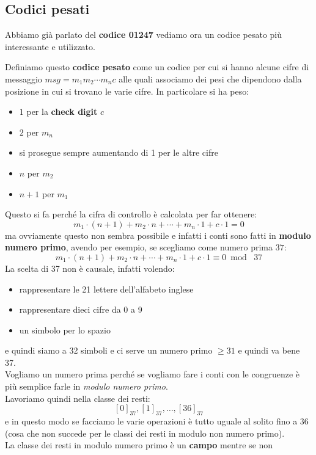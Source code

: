 \documentclass[a4paper,12pt, oneside]{book}
\begin{document}
\subsection{Codici pesati}
Abbiamo già parlato del \textbf{codice 01247} vediamo ora un codice pesato più
interessante e utilizzato.\\
\begin{definizione}
  Definiamo questo \textbf{codice pesato} come un codice per cui si hanno alcune cifre
  di messaggio $msg=m_1m_2\cdots m_nc$ alle quali associamo dei pesi che
  dipendono dalla posizione in cui si trovano le varie cifre. In particolare si
  ha peso:
  \begin{itemize}
    \item $1$ per la \textbf{check digit} $c$
    \item $2$ per $m_n$
    \item si prosegue sempre aumentando di 1 per le altre cifre
    \item $n$ per $m_2$
    \item $n+1$ per $m_1$
  \end{itemize}
\end{definizione}
Questo si fa perché la cifra di controllo è calcolata per far ottenere:
\[m_1\cdot (n+1)+m_2\cdot n+\cdots+m_n\cdot 1+c\cdot 1=0\]
ma ovviamente questo non sembra possibile e infatti i conti sono fatti in
\textbf{modulo numero primo}, avendo per esempio, se scegliamo come numero
prima $37$:
\[m_1\cdot (n+1)+m_2\cdot n+\cdots+m_n\cdot 1+c\cdot 1\equiv 0\bmod\,\, 37\]
La scelta di 37 non è causale, infatti volendo:
\begin{itemize}
  \item rappresentare le 21 lettere dell'alfabeto inglese
  \item rappresentare dieci cifre da 0 a 9
  \item un simbolo per lo spazio
\end{itemize}
e quindi siamo a 32 simboli e ci serve un numero primo $\geq 31$ e quindi va
bene 37.\\
Vogliamo un numero prima perché se vogliamo fare i conti con le congruenze è
più semplice farle in \emph{modulo numero primo}.\\
Lavoriamo quindi nella classe dei resti:
\[[0]_{37},[1]_{37},\ldots, [36]_{37}\]
e in questo modo se facciamo le varie operazioni è tutto uguale al solito fino
a 36 (cosa che non succede per le classi dei resti in modulo non numero
primo).\\
La classe dei resti in modulo numero primo è un \textbf{campo} mentre se non
\end{document}
